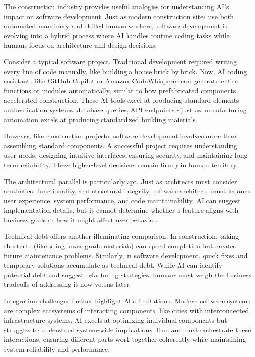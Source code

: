 \documentclass[
  Letterpaper,
]{scrbook}
\begin{document}
The construction industry provides useful analogies for understanding
AI's impact on software development. Just as modern construction sites
use both automated machinery and skilled human workers, software
development is evolving into a hybrid process where AI handles routine
coding tasks while humans focus on architecture and design decisions.

Consider a typical software project. Traditional development required
writing every line of code manually, like building a house brick by
brick. Now, AI coding assistants like GitHub Copilot or Amazon
CodeWhisperer can generate entire functions or modules automatically,
similar to how prefabricated components accelerated construction. These
AI tools excel at producing standard elements - authentication systems,
database queries, API endpoints - just as manufacturing automation
excels at producing standardized building materials.

However, like construction projects, software development involves more
than assembling standard components. A successful project requires
understanding user needs, designing intuitive interfaces, ensuring
security, and maintaining long-term reliability. These higher-level
decisions remain firmly in human territory.

The architectural parallel is particularly apt. Just as architects must
consider aesthetics, functionality, and structural integrity, software
architects must balance user experience, system performance, and code
maintainability. AI can suggest implementation details, but it cannot
determine whether a feature aligns with business goals or how it might
affect user behavior.

Technical debt offers another illuminating comparison. In construction,
taking shortcuts (like using lower-grade materials) can speed completion
but creates future maintenance problems. Similarly, in software
development, quick fixes and temporary solutions accumulate as technical
debt. While AI can identify potential debt and suggest refactoring
strategies, humans must weigh the business tradeoffs of addressing it
now versus later.

Integration challenges further highlight AI's limitations. Modern
software systems are complex ecosystems of interacting components, like
cities with interconnected infrastructure systems. AI excels at
optimizing individual components but struggles to understand system-wide
implications. Humans must orchestrate these interactions, ensuring
different parts work together coherently while maintaining system
reliability and performance.
\end{document}
